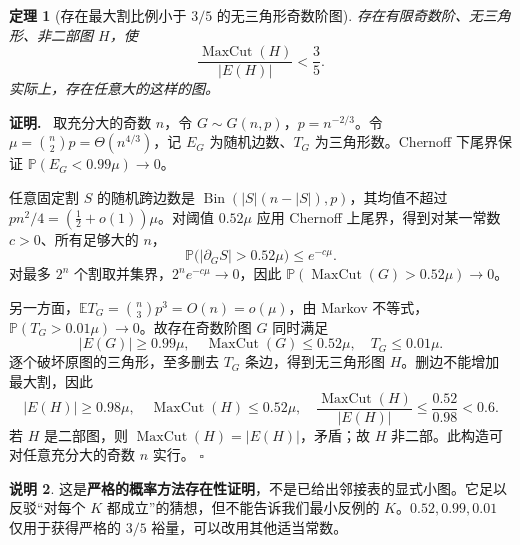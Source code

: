 \documentclass[11pt,a4paper]{ctexart}
\newtheorem{theorem}{定理}[section]
\theoremstyle{definition}
\newtheorem{remark}[theorem]{说明}
\newenvironment{proofcn}{\par\noindent\textbf{证明.}\ }{\hfill $\square$\par}
\newcommand{\MaxCut}{\operatorname{MaxCut}}
\begin{document}
\begin{theorem}[存在最大割比例小于 $3/5$ 的无三角形奇数阶图]\label{thm:exists}
存在有限\emph{奇数阶}、无三角形、非二部图 $H$，使
\begin{equation}\label{eq:ratio}
\frac{\MaxCut(H)}{|E(H)|}<\frac35.
\end{equation}
实际上，存在任意大的这样的图。
\end{theorem}
\begin{proofcn}
取充分大的奇数 $n$，令 $G\sim G(n,p)$，$p=n^{-2/3}$。令 $\mu=\binom n2p=\Theta(n^{4/3})$，记 $E_G$ 为随机边数、$T_G$ 为三角形数。Chernoff 下尾界保证
\(\mathbb P(E_G<0.99\mu)\to0\)。

任意固定割 $S$ 的随机跨边数是 $\operatorname{Bin}(|S|(n-|S|),p)$，其均值不超过 $pn^2/4=(\tfrac12+o(1))\mu$。对阈值 $0.52\mu$ 应用 Chernoff 上尾界，得到对某一常数 $c>0$、所有足够大的 $n$，
\[
\mathbb P\bigl(|\partial_GS|>0.52\mu\bigr)\le e^{-c\mu}.
\]
对最多 $2^n$ 个割取并集界，$2^ne^{-c\mu}\to0$，因此 $\mathbb P(\MaxCut(G)>0.52\mu)\to0$。

另一方面，$\mathbb ET_G=\binom n3p^3=O(n)=o(\mu)$，由 Markov 不等式，$\mathbb P(T_G>0.01\mu)\to0$。故存在奇数阶图 $G$ 同时满足
\[
|E(G)|\ge0.99\mu,\quad \MaxCut(G)\le0.52\mu,\quad T_G\le0.01\mu.
\]
逐个破坏原图的三角形，至多删去 $T_G$ 条边，得到无三角形图 $H$。删边不能增加最大割，因此
\[
|E(H)|\ge0.98\mu,\quad \MaxCut(H)\le0.52\mu,
\quad \frac{\MaxCut(H)}{|E(H)|}\le\frac{0.52}{0.98}<0.6.
\]
若 $H$ 是二部图，则 $\MaxCut(H)=|E(H)|$，矛盾；故 $H$ 非二部。此构造可对任意充分大的奇数 $n$ 实行。
\end{proofcn}

\begin{remark}
这是\textbf{严格的概率方法存在性证明}，不是已给出邻接表的显式小图。它足以反驳“对每个 $K$ 都成立”的猜想，但不能告诉我们最小反例的 $K$。$0.52,0.99,0.01$ 仅用于获得严格的 $3/5$ 裕量，可以改用其他适当常数。
\end{remark}
\end{document}
